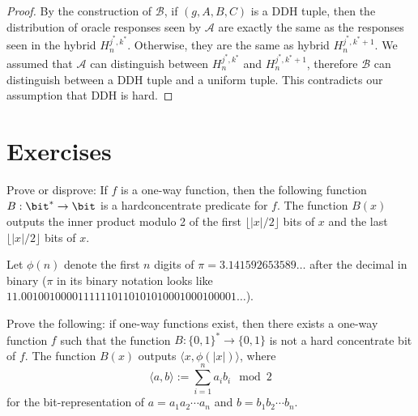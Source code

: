 \begin{proof}
    By the construction of $\mathcal{B}$, if $(g, A, B, C)$ is a DDH tuple, then the distribution of oracle responses seen by $\mathcal{A}$ are exactly the same as the responses seen in the hybrid $H_n^{j^*, k^*}$. Otherwise, they are the same as hybrid $H_n^{j^*, k^*+1}$.
    We assumed that $\mathcal{A}$ can distinguish between $H_n^{j^*, k^*}$ and $H_n^{j^*, k^*+1}$, therefore $\mathcal{B}$ can distinguish between a DDH tuple and a uniform tuple. This contradicts our assumption that DDH is hard.

\end{proof}


\newpage
\section*{Exercises}
\begin{exercise}

    Prove or disprove: If $f$ is a one-way function, then the following function $B:\bit^*\to\bit$ is a hardconcentrate predicate for $f$. The function $B(x)$ outputs the inner product modulo 2 of the first $\lfloor |x|/2\rfloor$ bits of $x$ and the last $\lfloor |x|/2\rfloor$ bits of $x$.
\end{exercise}

\begin{exercise}
    Let $\phi(n)$ denote the first $n$ digits of $\pi = 3.141592653589\ldots$ after the decimal in binary ($\pi$ in its binary notation looks like $11.00100100001111110110101010001000100001\ldots$).

    Prove the following: if one-way functions exist, then there exists a one-way function $f$ such that the function $B:\{0,1\}^* \rightarrow \{0,1\}$ is not a hard concentrate bit of $f$. The function $B(x)$ outputs $\langle x, \phi(|x|)\rangle$, where
    \[\langle a, b\rangle := \sum_{i=1}^n a_i b_i \mod 2\]
    for the bit-representation of $a = {a_1a_2\cdots a_n}$ and $b= {b_1b_2\cdots b_n}$.
\end{exercise}

